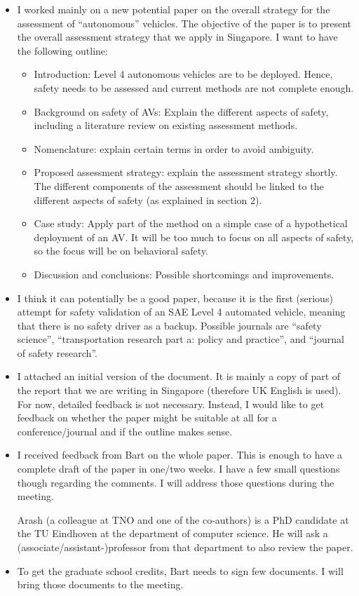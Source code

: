 \documentclass[10pt,final,a4paper,oneside,onecolumn]{article}
\begin{document}
\begin{itemize}
	\item I worked mainly on a new potential paper on the overall strategy for the assessment of ``autonomous'' vehicles. The objective of the paper is to present the overall assessment strategy that we apply in Singapore. I want to have the following outline:
	\begin{itemize}
		\item Introduction: Level 4 autonomous vehicles are to be deployed. Hence, safety needs to be assessed and current methods are not complete enough.
		\item Background on safety of AVs: Explain the different aspects of safety, including a literature review on existing assessment methods. 
		\item Nomenclature: explain certain terms in order to avoid ambiguity. 
		\item Proposed assessment strategy: explain the assessment strategy shortly. The different components of the assessment should be linked to the different aspects of safety (as explained in section 2). 
		\item Case study: Apply part of the method on a simple case of a hypothetical deployment of an AV. It will be too much to focus on all aspects of safety, so the focus will be on behavioral safety.
		\item Discussion and conclusions: Possible shortcomings and improvements.
	\end{itemize}
	\item I think it can potentially be a good paper, because it is the first (serious) attempt for safety validation of an SAE Level 4 automated vehicle, meaning that there is no safety driver as a backup. Possible journals are ``safety science'', ``transportation research part a: policy and practice'', and ``journal of safety research''. 
	\item I attached an initial version of the document. It is mainly a copy of part of the report that we are writing in Singapore (therefore UK English is used). For now, detailed feedback is not necessary. Instead, I would like to get feedback on whether the paper might be suitable at all for a conference/journal and if the outline makes sense.
	
	\item I received feedback from Bart on the whole paper. This is enough to have a complete draft of the paper in one/two weeks. I have a few small questions though regarding the comments. I will address those questions during the meeting.
	
	Arash (a colleague at TNO and one of the co-authors) is a PhD candidate at the TU Eindhoven at the department of computer science. He will ask a (associate/assistant-)professor from that department to also review the paper.
	
	\item To get the graduate school credits, Bart needs to sign few documents. I will bring those documents to the meeting.
\end{itemize}
\end{document}
